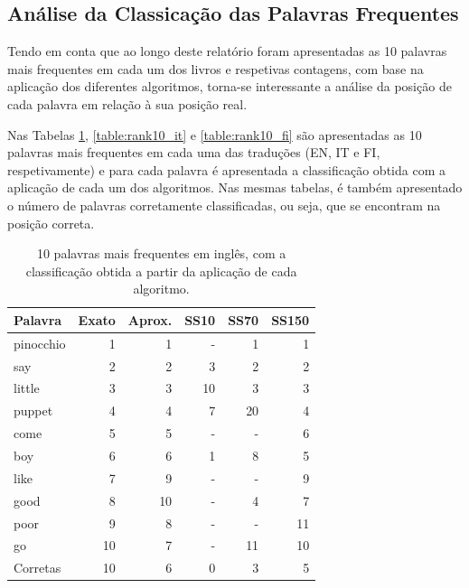 \documentclass[mirror, portugues]{revdetua}
\begin{document}
\subsection{Análise da Classicação das Palavras Frequentes}

Tendo em conta que ao longo deste relatório foram apresentadas as 10 palavras mais frequentes em cada um dos livros e respetivas contagens, com base na aplicação dos diferentes algoritmos, torna-se interessante a análise da posição de cada palavra em relação à sua posição real.

Nas Tabelas \ref{table:rank10_ing}, \ref{table:rank10_it} e \ref{table:rank10_fi} são apresentadas as 10 palavras mais frequentes em cada uma das traduções (EN, IT e FI, respetivamente) e para cada palavra é apresentada a classificação obtida com a aplicação de cada um dos algoritmos. Nas mesmas tabelas, é também apresentado o número de palavras corretamente classificadas, ou seja, que se encontram na posição correta.

\begin{table}[H]
\centering
\caption{10 palavras mais frequentes em inglês, com a classificação obtida a partir da aplicação de cada algoritmo.}
\label{table:rank10_ing}
\begin{tabular}{lrrrrr}
\toprule
Palavra & Exato & Aprox. & SS10 & SS70 & SS150 \\
\midrule
pinocchio & 1 & 1 & - & 1 & 1 \\
say & 2 & 2 & 3 & 2 & 2 \\
little & 3 & 3 & 10 & 3 & 3 \\
puppet & 4 & 4 & 7 & 20 & 4 \\
come & 5 & 5 & - & - & 6 \\
boy & 6 & 6 & 1 & 8 & 5 \\
like & 7 & 9 & - & - & 9 \\
good & 8 & 10 & - & 4 & 7 \\
poor & 9 & 8 & - & - & 11 \\
go & 10 & 7 & - & 11 & 10 \\
\midrule
Corretas & 10 & 6 & 0 & 3 & 5 \\
\bottomrule
\end{tabular}
\end{table}
\end{document}
